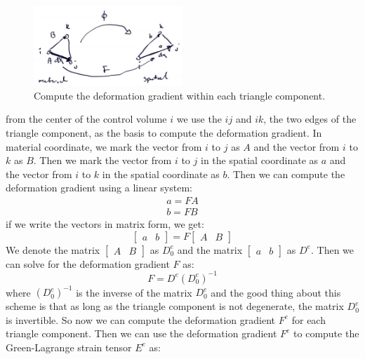 \documentclass[acmtog]{acmart}
\begin{document}
\begin{figure}[H]
  \centering
  \includegraphics[width=0.5\textwidth]{images/deformation.png}
  \caption{Compute the deformation gradient within each triangle component.}
  \label{fig:deformation}
\end{figure}

from the center of the control volume $i$ we use the $ij$ and $ik$, the two edges of the triangle component, as the basis to compute the deformation gradient. In material coordinate, we mark the vector from $i$ to $j$ as $A$ and the vector from $i$ to $k$ as $B$. Then we mark the vector from $i$ to $j$ in the spatial coordinate as $a$ and the vector from $i$ to $k$ in the spatial coordinate as $b$. Then we can compute the deformation gradient using a linear system:
\begin{align*}
  a = F A \\
  b = F B 
\end{align*}
if we write the vectors in matrix form, we get:
\begin{equation*}
  \begin{bmatrix}
    a & b
  \end{bmatrix}
  =
  F
  \begin{bmatrix}
    A & B
  \end{bmatrix}
\end{equation*}
We denote the matrix $\begin{bmatrix} A & B \end{bmatrix}$ as $D_0^e$ and the matrix $\begin{bmatrix} a & b \end{bmatrix}$ as $D^e$. Then we can solve for the deformation gradient $F$ as:
\begin{equation*}
  F = D^e (D_0^e)^{-1}
\end{equation*}
where $(D_0^e)^{-1}$ is the inverse of the matrix $D_0^e$ and the good thing about this scheme is that as long as the triangle component is not degenerate, the matrix $D_0^e$ is invertible. So now we can compute the deformation gradient $F^e$ for each triangle component. Then we can use the deformation gradient $F^e$ to compute the Green-Lagrange strain tensor $E^e$ as:
\end{document}
